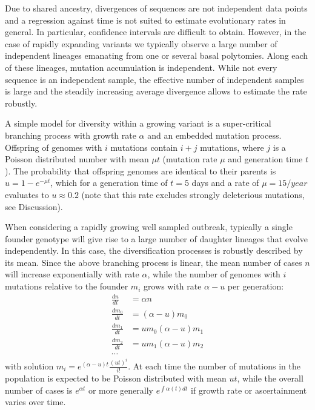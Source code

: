 \documentclass[aps,rmp, twocolumn]{revtex4}
\begin{document}
Due to shared ancestry, divergences of sequences are not independent data points and a regression against time is not suited to estimate evolutionary rates in general.
In particular, confidence intervals are difficult to obtain.
However, in the case of rapidly expanding variants we typically observe a large number of independent lineages emanating from one or several basal polytomies.
Along each of these lineages, mutation accumulation is independent.
While not every sequence is an independent sample, the effective number of independent samples is large and the steadily increasing average divergence allows to estimate the rate robustly.

A simple model for diversity within a growing variant is a super-critical branching process with growth rate $\alpha$ and an embedded mutation process.
Offspring of genomes with $i$ mutations contain $i+j$ mutations, where $j$ is a Poisson distributed number with mean $\mu t$ (mutation rate $\mu$ and generation time $t$).
The probability that offspring genomes are identical to their parents is $u = 1-e^{-\mu t}$, which for a generation time of $t=5$ days and a rate of $\mu = 15/year$ evaluates to $u\approx 0.2$ (note that this rate excludes strongly deleterious mutations, see Discussion).

When considering a rapidly growing well sampled outbreak, typically a single founder genotype will give rise to a large number of daughter lineages that evolve independently.
In this case, the diversification processes is robustly described by its mean.
Since the above branching process is linear, the mean number of cases $n$ will increase exponentially with rate $\alpha$, while the number of genomes with $i$ mutations relative to the founder $m_i$ grows with rate $\alpha - u$ per generation:
\begin{equation}
    \begin{split}
        \frac{dn}{dt} &= \alpha n \\
        \frac{dm_0}{dt} &= (\alpha - u) m_0 \\
        \frac{dm_1}{dt} &= u m_0 (\alpha - u) m_1 \\
        \frac{dm_2}{dt} &= u m_1 (\alpha - u) m_2 \\
        \cdots
    \end{split}
\end{equation}
with solution $m_i = e^{(\alpha - u)t} \frac{(ut)^i}{i!}$.
At each time the number of mutations in the population is expected to be Poisson distributed with mean $ut$, while the overall number of cases is $e^{\alpha t}$ or more generally $e^{\int \alpha(t) dt}$ if growth rate or ascertainment varies over time.
\end{document}
